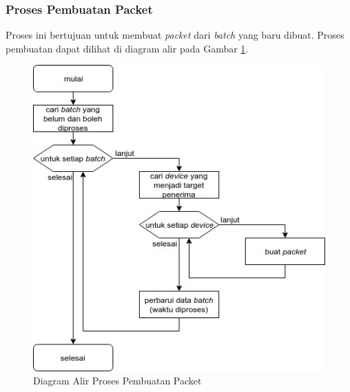 \subsubsection{Proses Pembuatan Packet}
\par Proses ini bertujuan untuk membuat \textit{packet} dari \textit{batch} yang baru dibuat. Proses pembuatan dapat dilihat di diagram alir pada Gambar \ref{flowchart_pembuatan_packet}.
\begin{figure}[hb]
	\centering\includegraphics[width=1\textwidth]{bab3/flowchart/flowchart-pembuatan_packet.jpg}
	\caption{Diagram Alir Proses Pembuatan Packet} \label{flowchart_pembuatan_packet}
\end{figure}

